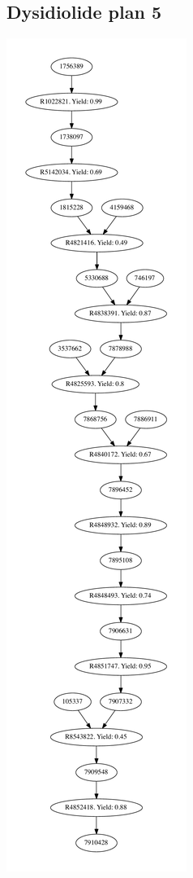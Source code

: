 \documentclass[a4paper,10pt,titlepage]{paper}
\begin{document}
\subsection{Dysidiolide plan 5}
\centering
\includegraphics[scale=0.4]{Synteseplaner/Dysidiolide/plan5.pdf}
\label{Appendix::Dysidiolide5}
\end{document}
